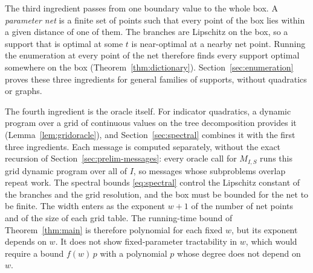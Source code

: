 The third ingredient passes from one boundary value to the whole box. A
\emph{parameter net} is a finite set of points such that every point of
the box lies within a given distance of one of them. The branches are
Lipschitz on the box, so a support that is optimal at some $t$ is
near-optimal at a nearby net point. Running the enumeration at every
point of the net therefore finds every support optimal somewhere on the
box (Theorem~\ref{thm:dictionary}). Section~\ref{sec:enumeration} proves
these three ingredients for general families of supports, without
quadratics or graphs.

The fourth ingredient is the oracle itself. For indicator quadratics, a
dynamic program over a grid of continuous values on the tree
decomposition provides it (Lemma~\ref{lem:gridoracle}), and
Section~\ref{sec:spectral} combines it with the first three ingredients.
Each message is computed separately, without the exact recursion of
Section~\ref{sec:prelim-messages}: every oracle call for $M_{I,S}$
runs this grid dynamic program over all of $I$, so messages whose
subproblems overlap repeat work. The spectral bounds \eqref{eq:spectral}
control the Lipschitz constant of the branches and the grid resolution,
and the box must be bounded for the net to be finite. The width enters
as the exponent $w+1$ of the number of net points and of the size of
each grid table. The running-time bound of Theorem~\ref{thm:main} is
therefore polynomial for each fixed $w$, but its exponent depends on
$w$. It does not show fixed-parameter tractability in $w$, which would
require a bound $f(w)\,p$ with a polynomial $p$ whose degree does not
depend on $w$.
